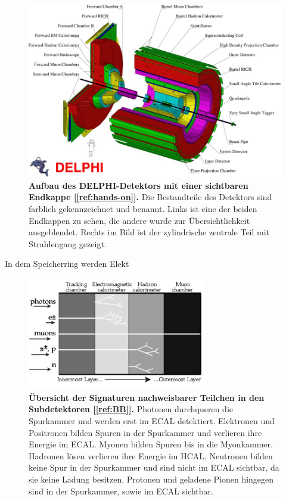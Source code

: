 \documentclass[a4paper,ngerman]{scrartcl}
\begin{document}
\begin{figure}[tb!]
\centering
\includegraphics[width=\textwidth]{abbildungen/delphi_big.png}
\caption{\textbf{Aufbau des DELPHI-Detektors mit einer sichtbaren Endkappe [\ref{ref:hands-on}].} 
Die Bestandteile des Detektors sind farblich gekennzeichnet und benannt.
Links ist eine der beiden Endkappen zu sehen, die andere wurde zur Übersichtlichkeit ausgeblendet.
Rechts im Bild ist der zylindrische zentrale Teil mit Strahlengang gezeigt. 
}
\label{fig:delphi_big}
\end{figure}

In dem Speicherring werden Elekt






\begin{figure}[tb!]
\centering
\includegraphics[width=0.7\textwidth]{abbildungen/delphi_schichten.png}
\caption{\textbf{Übersicht der Signaturen nachweisbarer Teilchen in den Subdetektoren [\ref{ref:BB}].} 
Photonen durchqueren die Spurkammer und werden erst im ECAL detektiert.
Elektronen und Positronen bilden Spuren in der Spurkammer und verlieren ihre Energie im ECAL.
Myonen bilden Spuren bis in die Myonkammer.
Hadronen lösen verlieren ihre Energie im HCAL.
Neutronen bilden keine Spur in der Spurkammer und sind nicht im ECAL sichtbar, da sie keine Ladung besitzen.
Protonen und geladene Pionen hingegen sind in der Spurkammer, sowie im ECAL sichtbar.
}
\label{fig:delphi_schichten}
\end{figure}
\end{document}
